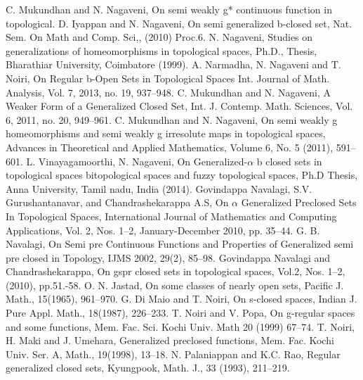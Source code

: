 \begin{thebibliography}{99}
 C. Mukundhan and N. Nagaveni, On semi weakly g* continuous function in topological. 
 D. Iyappan and N. Nagaveni, On semi generalized b-closed set, Nat. Sem. On Math and Comp. Sci,, (2010) Proc.6.
 N. Nagaveni, Studies on generalizations of homeomorphisms in topological spaces, Ph.D., Thesis, Bharathiar University, Coimbatore (1999).
 A. Narmadha, N. Nagaveni and T. Noiri, On Regular b-Open Sets in Topological Spaces Int. Journal of Math. Analysis, Vol. 7, 2013, no. 19, 937--948.
 C. Mukundhan and N. Nagaveni, A Weaker Form of a Generalized Closed Set, Int. J. Contemp. Math. Sciences, Vol. 6, 2011, no. 20, 949--961.
 C. Mukundhan and N. Nagaveni, On semi weakly g homeomorphisms and semi weakly g irresolute maps in topological spaces, Advances in Theoretical and Applied Mathematics, Volume 6, No. 5 (2011), 591--601.
 L. Vinayagamoorthi, N. Nagaveni, On Generalized-$\alpha$ b closed sets in topological spaces bitopological spaces and fuzzy topological spaces, Ph.D Thesis, Anna University, Tamil nadu, India (2014).
 Govindappa Navalagi, S.V. Gurushantanavar, and Chandrashekarappa A.S,  On $\alpha$ Generalized Preclosed Sets In Topological Spaces, International Journal of Mathematics and Computing Applications, Vol. 2, Nos. 1--2, January-December 2010, pp. 35--44.
 G. B. Navalagi, On Semi pre Continuous Functions and Properties of Generalized semi pre closed in Topology, IJMS 2002, 29(2), 85--98.
 Govindappa Navalagi and Chandrashekarappa, On gspr closed sets in topological spaces, Vol.2, Nos. 1--2, (2010), pp.51.-58.
 O. N. Jastad, On some classes of nearly open sets,  Pacific J. Math., 15(1965), 961--970.
 G. Di Maio and T. Noiri, On s-closed spaces, Indian J. Pure Appl. Math., 18(1987), 226--233.
 T. Noiri and V. Popa, On g-regular spaces and some functions, Mem. Fac. Sci. Kochi Univ. Math 20 (1999) 67--74.
 T. Noiri, H. Maki and J. Umehara, Generalized preclosed functions, Mem. Fac. Kochi Univ. Ser. A, Math., 19(1998), 13--18.
 N. Palaniappan and K.C. Rao, Regular generalized closed sets, Kyungpook, Math. J., 33 (1993), 211--219.

\end{thebibliography}

